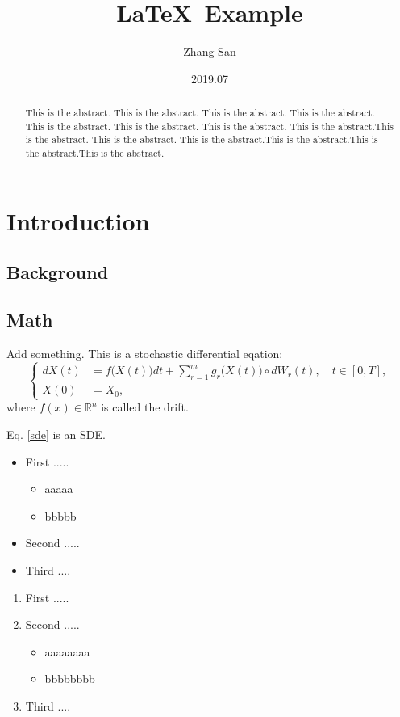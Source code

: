 \documentclass{article}
\title{\LaTeX \, Example}
\author{Zhang San}
\date{2019.07}
\begin{document}
\maketitle

\begin{abstract}
This is the abstract. This is the abstract. This is the abstract. This is the abstract. This is the abstract. This is the abstract. This is the abstract. This is the abstract.This is the abstract. This is the abstract. This is the abstract.This is the abstract.This is the abstract.This is the abstract.
\end{abstract}


\section{Introduction} 

\subsection{Background}




\subsection{Math}
Add something.
This is a stochastic differential eqation: 
\begin{equation}\label{sde}
\left\{
\begin{aligned}
	dX(t) &= f\big(X(t)\big)dt + \sum_{r=1}^m g_r\big(X(t)\big) \circ dW_r(t), \quad t\in [0, T],\\
	X(0) &= X_0,
\end{aligned}\right.
\end{equation}
where $f(x) \in \mathbb{R}^n$ is called the drift.

Eq. \ref{sde} is an SDE.


\begin{itemize}
	\item First .....
	\begin{itemize}
		\item aaaaa
		\item bbbbb
	\end{itemize}
	\item Second .....
	\item Third ....
\end{itemize}

\begin{enumerate}
	\item First .....
	\item Second .....
	\begin{itemize}
		\item aaaaaaaa
		\item bbbbbbbb
	\end{itemize}
	\item Third ....
\end{enumerate}
\end{document}
